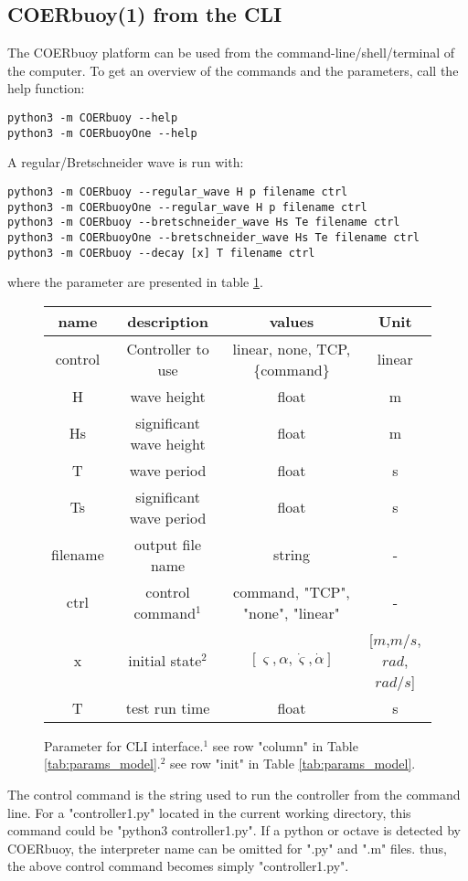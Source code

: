 \documentclass[oneside,10pt,a4paper]{book}
\begin{document}
\subsection{COERbuoy(1) from the CLI}
The COERbuoy platform can be used from the command-line/shell/terminal of the computer. To get an overview of the commands and the parameters, call the help function:
\begin{verbatim}
python3 -m COERbuoy --help
python3 -m COERbuoyOne --help
\end{verbatim}
A regular/Bretschneider wave is run with:
\begin{verbatim}
python3 -m COERbuoy --regular_wave H p filename ctrl
python3 -m COERbuoyOne --regular_wave H p filename ctrl
python3 -m COERbuoy --bretschneider_wave Hs Te filename ctrl
python3 -m COERbuoyOne --bretschneider_wave Hs Te filename ctrl
python3 -m COERbuoy --decay [x] T filename ctrl
\end{verbatim} 
where the parameter are presented in table \ref{tab:params_CLI}.
\begin{figure}[h!]\label{tab:params_CLI}
	\begin{tabular}{|c|c|c|c|}
		\hline
		name & description & values& Unit\\
		\hline
		control &Controller to use & linear, none, TCP, \{command\} & linear \\
		\hline
		H&wave height&float&m\\
		\hline
		Hs&significant wave height&float&m\\
		\hline
		T&wave period&float&s\\
		\hline
		Ts&significant wave period&float&s\\
		\hline
		filename&output file name&string&-\\
		\hline
		ctrl&control command$^1$&{command}, "TCP", "none", "linear"&-\\
		\hline
		x&initial state$^2$&$[\varsigma, \alpha, \dot{\varsigma}, \dot{\alpha}]$&[$m$,$m/s$,$rad$,$rad/s$]\\
		\hline
		T&test run time&float&s\\
		\hline
	\end{tabular}
	\caption{Parameter for CLI interface.$^1$ see row "column" in Table \ref{tab:params_model}.$^2$ see row "init" in Table \ref{tab:params_model}.}
\end{figure}
The control command is the string used to run the controller from the command line. For a "controller1.py" located in the current working directory, this command could be "python3 controller1.py". If a python or octave is detected by COERbuoy, the interpreter name can be omitted for ".py" and ".m" files. thus, the above control command becomes simply "controller1.py".
\end{document}
